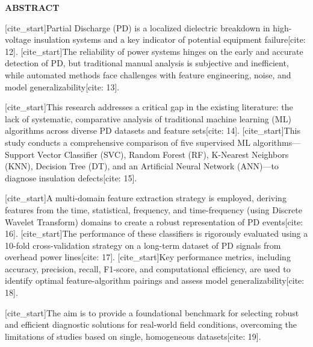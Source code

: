 \begin{center}
    \textbf{ABSTRACT}
\end{center}

[cite_start]Partial Discharge (PD) is a localized dielectric breakdown in high-voltage insulation systems and a key indicator of potential equipment failure[cite: 12]. [cite_start]The reliability of power systems hinges on the early and accurate detection of PD, but traditional manual analysis is subjective and inefficient, while automated methods face challenges with feature engineering, noise, and model generalizability[cite: 13].

[cite_start]This research addresses a critical gap in the existing literature: the lack of systematic, comparative analysis of traditional machine learning (ML) algorithms across diverse PD datasets and feature sets[cite: 14]. [cite_start]This study conducts a comprehensive comparison of five supervised ML algorithms---Support Vector Classifier (SVC), Random Forest (RF), K-Nearest Neighbors (KNN), Decision Tree (DT), and an Artificial Neural Network (ANN)---to diagnose insulation defects[cite: 15].

[cite_start]A multi-domain feature extraction strategy is employed, deriving features from the time, statistical, frequency, and time-frequency (using Discrete Wavelet Transform) domains to create a robust representation of PD events[cite: 16]. [cite_start]The performance of these classifiers is rigorously evaluated using a 10-fold cross-validation strategy on a long-term dataset of PD signals from overhead power lines[cite: 17]. [cite_start]Key performance metrics, including accuracy, precision, recall, F1-score, and computational efficiency, are used to identify optimal feature-algorithm pairings and assess model generalizability[cite: 18].

[cite_start]The aim is to provide a foundational benchmark for selecting robust and efficient diagnostic solutions for real-world field conditions, overcoming the limitations of studies based on single, homogeneous datasets[cite: 19].